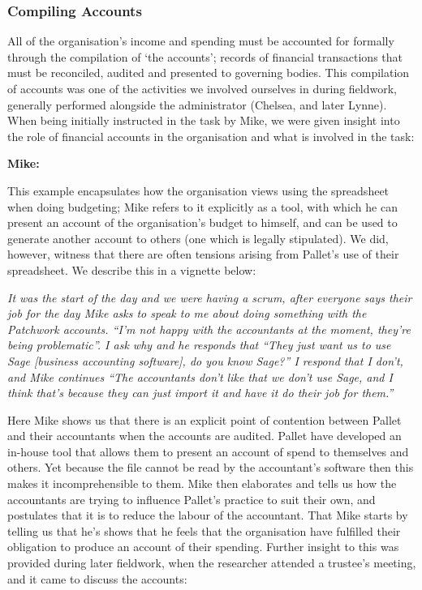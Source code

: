 \subsubsection{Compiling Accounts}
All of the organisation's income and spending must be accounted for formally through the compilation of `the accounts'; records of financial transactions that must be reconciled, audited and presented to governing bodies. This compilation of accounts was one of the activities we involved ourselves in during fieldwork, generally performed alongside the administrator (Chelsea, and later Lynne). When being initially instructed in the task by Mike, we were given insight into the role of financial accounts in the organisation and what is involved in the task:

\textbf{Mike:} 

This example encapsulates how the organisation views using the spreadsheet when doing budgeting; Mike refers to it explicitly as a tool, with which he can present an account of the organisation's budget to himself, and can be used to generate another account to others (one which is legally stipulated). We did, however, witness that there are often tensions arising from Pallet's use of their spreadsheet. We describe this in a vignette below:

\textit{It was the start of the day and we were having a scrum, after everyone says their job for the day Mike asks to speak to me about doing something with the Patchwork accounts. ``I'm not happy with the accountants at the moment, they're being problematic''. I ask why and he responds that ``They just want us to use Sage [business accounting software], do you know Sage?'' I respond that I don't, and Mike continues ``The accountants don't like that we don't use Sage, and I think that's because they can just import it and have it do their job for them.''}

Here Mike shows us that there is an explicit point of contention between Pallet and their accountants when the accounts are audited. Pallet have developed an in-house tool that allows them to present an account of spend to themselves and others. Yet because the file cannot be read by the accountant's software then this makes it incomprehensible to them. Mike then elaborates and tells us how the accountants are trying to influence Pallet's practice to suit their own, and postulates that it is to reduce the labour of the accountant. That Mike starts by telling us that he's  shows that he feels that the organisation have fulfilled their obligation to produce an account of their spending. Further insight to this was provided during later fieldwork, when the researcher attended a trustee's meeting, and it came to discuss the accounts:

